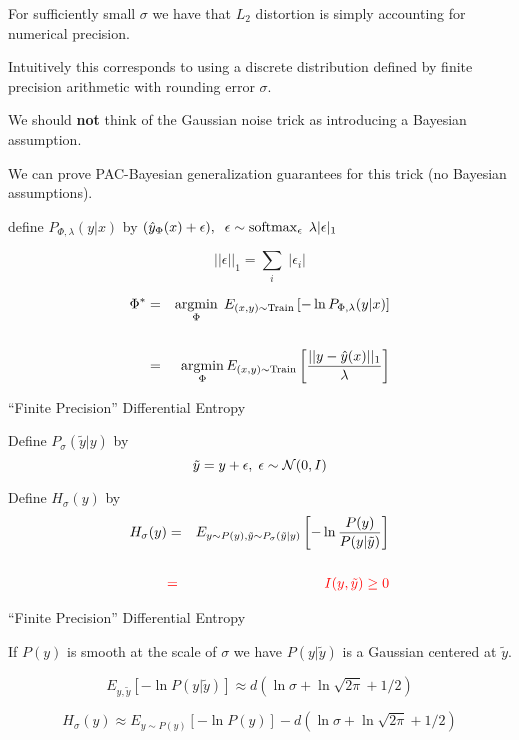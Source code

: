 {

For sufficiently small $\sigma$ we have that $L_2$ distortion is simply accounting for numerical precision.

\vfill
Intuitively this corresponds to using a discrete distribution defined by finite precision arithmetic with rounding error $\sigma$.

\vfill
We should {\bf not} think of the Gaussian noise trick as introducing a Bayesian assumption.

\vfill
We can prove PAC-Bayesian generalization guarantees for this trick (no Bayesian assumptions).


define $P_{\Phi,\lambda}(y|x)$ by $(\hat{y}_\Phi(x) + \epsilon),\;\; \epsilon \sim \operatorname*{softmax}_\epsilon \;\lambda |\epsilon|_1$

\vfill
$$||\epsilon||_1 = \sum_i \;|\epsilon_i|$$

\vfill
{\huge
\begin{eqnarray*}
\Phi^* & = & \operatorname*{argmin}_{\Phi}\;E_{(x,y)\sim \mathrm{Train}}\left[-\ln P_{\Phi,\lambda}(y|x)\right] \\
\\
& = & \operatorname*{argmin}_\Phi E_{(x,y)\sim \mathrm{Train}} \left[\frac{||y - \hat{y}(x)||_1}{\lambda}\right]
\end{eqnarray*}
}

{``Finite Precision'' Differential Entropy}

Define $P_\sigma(\tilde{y}|y)$ by
$$\tilde{y} = y + \epsilon,\;\epsilon \sim {\cal N}(0,I)$$

\vfill
Define $H_\sigma(y)$ by
\begin{eqnarray*}
H_\sigma(y) & = & E_{y \sim P(y),\tilde{y} \sim P_\sigma(\tilde{y}|y)}\left[ -\ln \frac{P(y)}{P(y|\tilde{y})}\right] \\
\\
& {\color{red} =} & {\color{red} I(y,\tilde{y}) \geq 0}
\end{eqnarray*}


{``Finite Precision'' Differential Entropy}

If $P(y)$ is smooth at the scale of $\sigma$ we have $P(y|\tilde{y})$ is a Gaussian centered at $\tilde{y}$.

$$E_{y,\tilde{y}}[- \ln P(y|\tilde{y})] \approx d(\ln \sigma + \ln{\sqrt{2\pi}} + 1/2)$$

$$H_\sigma(y) \approx E_{y \sim P(y)}\left[ - \ln P(y)\right]  - d(\ln \sigma + \ln \sqrt{2\pi} + 1/2)$$

}

